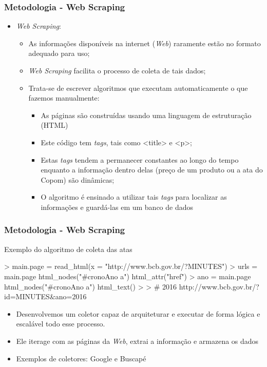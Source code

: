 \documentclass[aspectratio=169]{beamer}
\begin{document}
\begin{frame}\frametitle{Metodologia - Web Scraping}
  \begin{itemize}
  \item \emph{Web Scraping}:
    \begin{itemize}
      \item As informações disponíveis na internet (\emph{Web}) raramente estão no formato adequado para uso;
      \item \emph{Web Scraping} facilita o processo de coleta de tais dados;
      \item Trata-se de escrever algoritmos que executam automaticamente o que fazemos manualmente:
      \begin{itemize}
        \item As páginas são construídas usando uma linguagem de estruturação (HTML)
        \item Este código tem \emph{tags}, tais como <title> e <p>;
        \item Estas \emph{tags} tendem a permanecer constantes ao longo do tempo enquanto a informação dentro delas (preço de um produto ou a ata do Copom) são dinâmicas;
        \item O algoritmo é ensinado a utilizar tais \emph{tags} para localizar as informações e guardá-las em um banco de dados
      \end{itemize}
    \end{itemize}
  \end{itemize}
\end{frame}

\begin{frame}[fragile]\frametitle{Metodologia - Web Scraping} 
  \begin{block}{Exemplo do algoritmo de coleta das atas}
\begin{Schunk}
	\begin{Sinput}
		> main.page = read_html(x = "http://www.bcb.gov.br/?MINUTES")
		> urls = main.page %
		html_nodes("#cronoAno a") %
		html_attr("href")  
		> ano = main.page %
		html_nodes("#cronoAno a") %
		html_text() 
		> 
		> # 2016 http://www.bcb.gov.br/?id=MINUTES&ano=2016                                               
	\end{Sinput}
\end{Schunk}
  \end{block}
  \begin{itemize}
    \item Desenvolvemos um coletor capaz de arquiteturar e executar de forma lógica e escalável todo esse processo. 
    \item Ele iterage com as páginas da \emph{Web}, extrai a informação e armazena os dados
    \item Exemplos de coletores: Google e Buscapé
  \end{itemize}
\end{frame}
\end{document}
